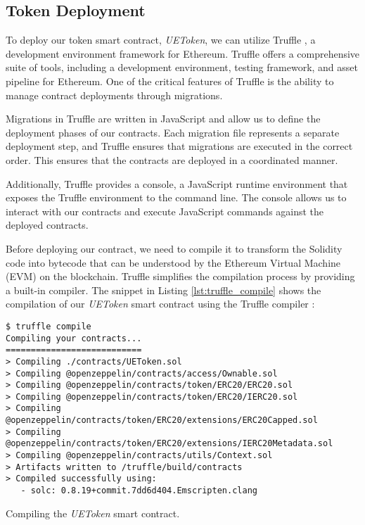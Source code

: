 
\subsection{Token Deployment}
\label{subsec:token_deployment}

To deploy our token smart contract, \textit{UEToken}, we can utilize Truffle \cite{truffle}, a development environment framework for Ethereum. Truffle offers a comprehensive suite of tools, including a development environment, testing framework, and asset pipeline for Ethereum. One of the critical features of Truffle is the ability to manage contract deployments through migrations.

Migrations in Truffle are written in JavaScript and allow us to define the deployment phases of our contracts. Each migration file represents a separate deployment step, and Truffle ensures that migrations are executed in the correct order. This ensures that the contracts are deployed in a coordinated manner.

Additionally, Truffle provides a console, a JavaScript runtime environment that exposes the Truffle environment to the command line. The console allows us to interact with our contracts and execute JavaScript commands against the deployed contracts.

Before deploying our contract, we need to compile it to transform the Solidity code into bytecode that can be understood by the Ethereum Virtual Machine (EVM)
on the blockchain. Truffle simplifies the compilation process by providing a built-in compiler. The snippet in Listing \ref{lst:truffle_compile} shows the compilation
of our \textit{UEToken} smart contract using the Truffle compiler :


\begin{listing}[H]
    \begin{verbatim}
$ truffle compile
Compiling your contracts...
===========================
> Compiling ./contracts/UEToken.sol
> Compiling @openzeppelin/contracts/access/Ownable.sol
> Compiling @openzeppelin/contracts/token/ERC20/ERC20.sol
> Compiling @openzeppelin/contracts/token/ERC20/IERC20.sol
> Compiling @openzeppelin/contracts/token/ERC20/extensions/ERC20Capped.sol
> Compiling @openzeppelin/contracts/token/ERC20/extensions/IERC20Metadata.sol
> Compiling @openzeppelin/contracts/utils/Context.sol
> Artifacts written to /truffle/build/contracts
> Compiled successfully using:
   - solc: 0.8.19+commit.7dd6d404.Emscripten.clang
    \end{verbatim}
    \caption{Compiling the \textit{UEToken} smart contract.}
    \label{lst:truffle_compile}
\end{listing}

